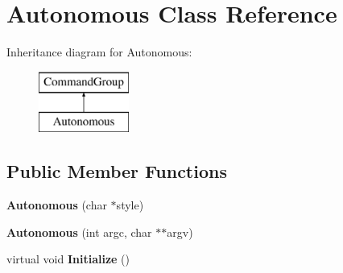 \hypertarget{class_autonomous}{}\section{Autonomous Class Reference}
\label{class_autonomous}
Inheritance diagram for Autonomous\+:\begin{figure}[H]
\begin{center}
\leavevmode
\includegraphics[height=2.000000cm]{class_autonomous}
\end{center}
\end{figure}
\subsection*{Public Member Functions}
\begin{DoxyCompactItemize}
\item 
\hypertarget{class_autonomous_a1d40e572e145f77795f0061fd2bb8773}{}{\bfseries Autonomous} (char $\ast$style)\label{class_autonomous_a1d40e572e145f77795f0061fd2bb8773}

\item 
\hypertarget{class_autonomous_a55f5b6ad9641b9335c8569586877d17e}{}{\bfseries Autonomous} (int argc, char $\ast$$\ast$argv)\label{class_autonomous_a55f5b6ad9641b9335c8569586877d17e}

\item 
\hypertarget{class_autonomous_a29e2122506fb216d8f5624e18978b66b}{}virtual void {\bfseries Initialize} ()\label{class_autonomous_a29e2122506fb216d8f5624e18978b66b}

\end{DoxyCompactItemize}
